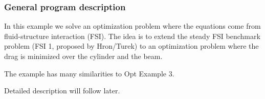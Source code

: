 \subsubsection{General program description}
In this example we solve an optimization problem where 
the equations come from fluid-structure interaction (FSI). The idea
is to extend the steady FSI benchmark problem (FSI 1, proposed by Hron/Turek) to an optimization 
problem where the drag is minimized over the cylinder and the beam. 

The example has many similarities to Opt Example 3.

Detailed description will follow later. %
